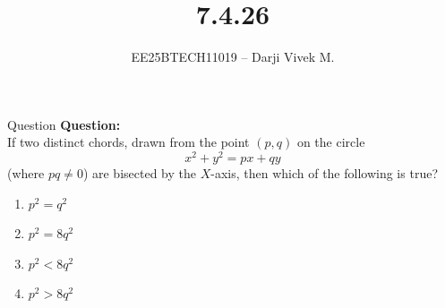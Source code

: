 \documentclass{beamer}
\title{7.4.26}
\author{EE25BTECH11019 -- Darji Vivek M.}
\date{}
\begin{document}
\begin{frame}
\begin{titlepage}

\end{titlepage}
\end{frame}
\begin{frame}{Question}
\textbf{Question:}\\[2pt]
If two distinct chords, drawn from the point $(p,q)$ on the circle 
\[
x^2 + y^2 = px + qy
\]
(where $pq \ne 0$) are bisected by the $X$-axis, then which of the following is true?\\[2pt]
\begin{enumerate}
    \item $p^2 = q^2$
    \item $p^2 = 8q^2$
    \item $p^2 < 8q^2$
    \item $p^2 > 8q^2$
\end{enumerate}
\end{frame}
\end{document}
